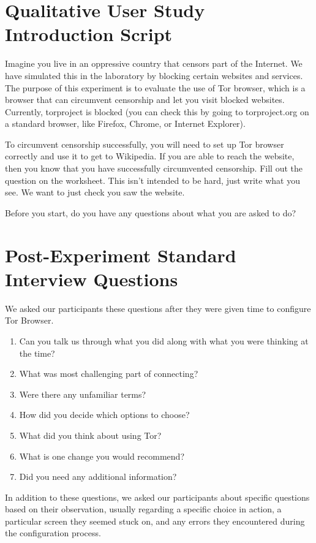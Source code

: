 \documentclass[USenglish,oneside,twocolumn]{article}
\begin{document}
\section{Qualitative User Study Introduction Script} 
\label{qualitative-script} 
Imagine you live in an oppressive country that censors part of the Internet. We have simulated this in the laboratory by blocking certain websites and services.  The purpose of this experiment is to evaluate the use of Tor browser, which is a browser that can circumvent censorship and let you visit blocked websites. Currently, torproject is blocked (you can check this by going to torproject.org on a standard browser, like Firefox, Chrome, or Internet Explorer). 

To circumvent censorship successfully, you will need to set up Tor browser correctly and use it to get to Wikipedia. If you are able to reach the website, then you know that you have successfully circumvented censorship. Fill out the question on the worksheet. This isn't intended to be hard, just write what you see. We want to just check you saw the website. 

Before you start, do you have any questions about what you are asked to do? 

\section{Post-Experiment Standard Interview Questions}
We asked our participants these questions after they were given time to configure Tor Browser. \\

\begin{enumerate}
\item{Can you talk us through what you did along with what you were thinking at the time?}
\item{What was most challenging part of connecting?}
\item{Were there any unfamiliar terms?}
\item{How did you decide which options to choose?}
\item{What did you think about using Tor?}
\item{What is one change you would recommend?} 
\item{Did you need any additional information?} 
\end{enumerate}  

In addition to these questions, we asked our participants about specific questions based on their observation, usually regarding a specific choice in action, a particular screen they seemed stuck on, and any errors they encountered during the configuration process. 
\end{document}

